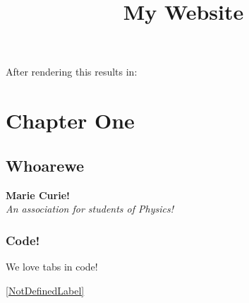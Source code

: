 After rendering this results in: \\
    \title{My Website}
        \section{Chapter One}
        \subsection{Whoarewe}
        \begin{paragraph}
            \textbf{Marie Curie!} \\
            \textit{An association for students of Physics!}
        \end{paragraph}
        \subsubsection{Code!}
            \begin{code}
                    We love tabs in code!
            \end{code}       
        \ref{NotDefinedLabel}
